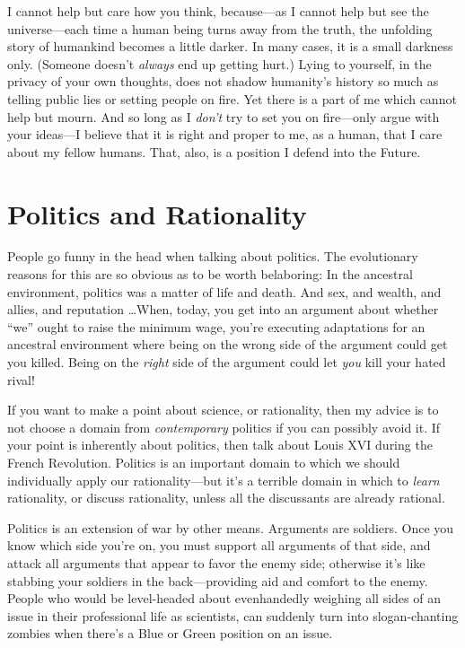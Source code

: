 {
 I cannot help but care how you think, because---as I cannot help
but see the universe---each time a human being turns away from the
truth, the unfolding story of humankind becomes a little darker. In
many cases, it is a small darkness only. (Someone
doesn't \textit{always} end up getting hurt.) Lying to
yourself, in the privacy of your own thoughts, does not shadow
humanity's history so much as telling public lies or
setting people on fire. Yet there is a part of me which cannot help but
mourn. And so long as I \textit{don't} try to set you
on fire---only argue with your ideas---I believe that it is right and
proper to me, as a human, that I care about my fellow humans. That,
also, is a position I defend into the Future.}

\myendsectiontext


\chapter{Politics and Rationality}


{
 People go funny in the head when talking about politics. The
evolutionary reasons for this are so obvious as to be worth belaboring:
In the ancestral environment, politics was a matter of life and death.
And sex, and wealth, and allies, and reputation \ldots When, today, you
get into an argument about whether
``we'' ought to raise the minimum
wage, you're executing adaptations for an ancestral
environment where being on the wrong side of the argument could get you
killed. Being on the \textit{right} side of the argument could let
\textit{you} kill your hated rival! }

{
 If you want to make a point about science, or rationality, then my
advice is to not choose a domain from \textit{contemporary} politics if
you can possibly avoid it. If your point is inherently about politics,
then talk about Louis XVI during the French Revolution. Politics is an
important domain to which we should individually apply our
rationality---but it's a terrible domain in which to
\textit{learn} rationality, or discuss rationality, unless all the
discussants are already rational.}

{
 Politics is an extension of war by other means. Arguments are
soldiers. Once you know which side you're on, you must
support all arguments of that side, and attack all arguments that
appear to favor the enemy side; otherwise it's like
stabbing your soldiers in the back---providing aid and comfort to the
enemy. People who would be level-headed about evenhandedly weighing all
sides of an issue in their professional life as scientists, can
suddenly turn into slogan-chanting zombies when there's
a Blue or Green position on an issue.}

